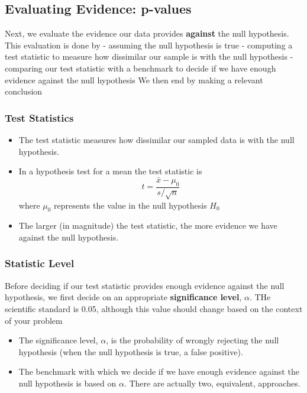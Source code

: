 \documentclass[
  openany]{book}
\providecommand{\tightlist}{%
  \setlength{\itemsep}{0pt}\setlength{\parskip}{0pt}}
\begin{document}
\subsection{Evaluating Evidence: p-values}\label{evaluating-evidence-p-values}

Next, we evaluate the evidence our data provides \textbf{against} the null hypothesis. This evaluation is done by - assuming the null hypothesis is true - computing a test statistic to measure how dissimilar our sample is with the null hypothesis - comparing our test statistic with a benchmark to decide if we have enough evidence against the null hypothesis We then end by making a relevant conclusion

\subsubsection{Test Statistics}\label{test-statistics}

\begin{itemize}
\tightlist
\item
  The test statistic measures how dissimilar our sampled data is with the null hypothesis.
\item
  In a hypothesis test for a mean the test statistic is \begin{equation}
  t=\frac{\bar{x}-\mu_0}{s/\sqrt{n}}
  \label{eq:hyptstmean}
  \end{equation} where \(\mu_0\) represents the value in the null hypothesis \(H_0\)
\item
  The larger (in magnitude) the test statistic, the more evidence we have against the null hypothesis.
\end{itemize}

\subsubsection{Statistic Level}\label{statistic-level}

Before deciding if our test statistic provides enough evidence against the null hypothesis, we first decide on an appropriate \textbf{significance level}, \(\alpha\). THe scientific standard is 0.05, although this value should change based on the context of your problem

\begin{itemize}
\tightlist
\item
  The significance level, \(\alpha\), is the probability of wrongly rejecting the null hypothesis (when the null hypothesis is true, a false positive).
\item
  The benchmark with which we decide if we have enough evidence against the null hypothesis is based on \(\alpha\). There are actually two, equivalent, approaches.
\end{itemize}
\end{document}
